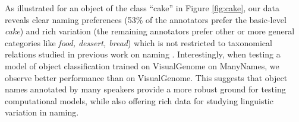 As illustrated for an object of the class ``cake'' in Figure \ref{fig:cake}, our data reveals clear naming preferences (53\% of the annotators prefer the basic-level \textit{cake}) and rich variation (the remaining annotators prefer other or more general categories like \textit{food, dessert, bread}) which is not restricted to taxonomical relations studied in previous work on naming \cite{rosch1976basic,Ordonez:2016,graf2016animal}. 
Interestingly, when testing a model of object classification trained on VisualGenome on ManyNames, we observe better performance than on VisualGenome.
This suggests that object names annotated by many speakers provide a more robust ground for testing computational models, while also offering rich data for studying linguistic variation in naming.


